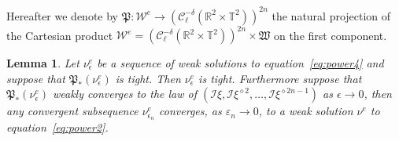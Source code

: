 \documentclass[a4paper,10pt]{article}
\newcommand{\asterisk}{\mathord{*}}
\newtheorem{lemma}{Lemma}
\begin{document}
Hereafter we denote by $\mathfrak{P :} \mathcal{W}^e \rightarrow
(\mathcal{C}^{- \delta}_{\ell} (\mathbb{R}^2 \times \mathbb{T}^2))^{2 n}$ the
natural projection of the Cartesian product $\mathcal{W}^e = (\mathcal{C}^{-
\delta}_{\ell} (\mathbb{R}^2 \times \mathbb{T}^2))^{2 n} \times \mathfrak{W}$
on the first component.

\begin{lemma}
  Let $\nu_{\epsilon}^e$ be a sequence of weak solutions to
  equation~{\eqref{eq:power4}} and suppose that $\mathfrak{P}_{\asterisk}
  (\nu_{\epsilon}^e)$ is tight. Then $\nu_{\epsilon}^e$ is tight. Furthermore
  suppose that $\mathfrak{P}_{\asterisk} (\nu_{\epsilon}^e)$ weakly converges
  to the law of $(\mathcal{I} \xi, \mathcal{I} \xi^{\diamond 2}, \ldots,
  \mathcal{I} \xi^{\diamond 2 n - 1})$ as $\epsilon \rightarrow 0$, then any
  convergent subsequence $\nu_{\epsilon_n}^e$ converges, as $\varepsilon_n
  \rightarrow 0$, to a weak solution $\nu^e$ to equation~{\eqref{eq:power2}}.
\end{lemma}
\end{document}
